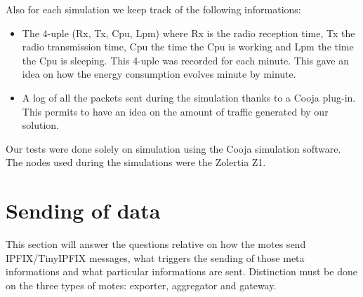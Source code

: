 Also for each simulation we keep track of the following informations:
\begin{itemize}
  \item The 4-uple (Rx, Tx, Cpu, Lpm) where Rx is the radio reception time, Tx the radio transmission time, Cpu the time the Cpu is working and Lpm the time the Cpu is sleeping. This 4-uple was recorded for each minute. This gave an idea on how the energy consumption evolves minute by minute.
  \item A log of all the packets sent during the simulation thanks to a Cooja plug-in. This permits to have an idea on the amount of traffic generated by our solution.\\
\end{itemize}

Our tests were done solely on simulation using the Cooja simulation software. The nodes used during the simulations were the Zolertia Z1.

\section{Sending of data}

This section will answer the questions relative on how the motes send IPFIX/TinyIPFIX messages, what triggers the sending of those meta informations and what particular informations are sent. Distinction must be done on the three types of motes: exporter, aggregator and gateway.\\

